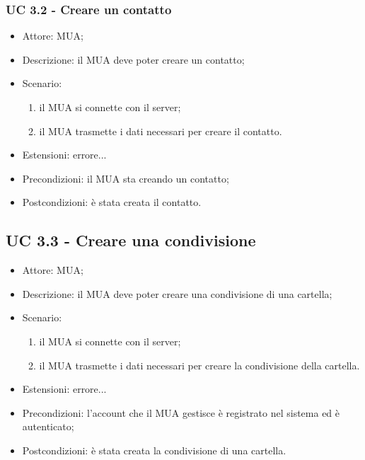     \subsubsection{UC 3.2 - Creare un contatto} \label{sec: UC 3.2}
    \begin{itemize}
        \item Attore: MUA;
        \item Descrizione: il MUA deve poter creare un contatto;
        \item Scenario:
        \begin{enumerate}
        \item il MUA si connette con il server;
        \item il MUA trasmette i dati necessari per creare il contatto.
        \end{enumerate}
        \item Estensioni: errore...
        \item Precondizioni: il MUA sta creando un contatto;
        \item Postcondizioni: è stata creata il contatto.
    \end{itemize}

    \subsection{UC 3.3 - Creare una condivisione} \label{sec: UC 3.3}
    \begin{itemize}
        \item Attore: MUA;
        \item Descrizione: il MUA deve poter creare una condivisione di una cartella;
        \item Scenario:
        \begin{enumerate}
        \item il MUA si connette con il server;
        \item il MUA trasmette i dati necessari per creare la condivisione della cartella.
        \end{enumerate}
        \item Estensioni: errore...
        \item Precondizioni: l’account che il MUA gestisce è registrato nel sistema ed è autenticato;
        \item Postcondizioni: è stata creata la condivisione di una cartella.
    \end{itemize}

